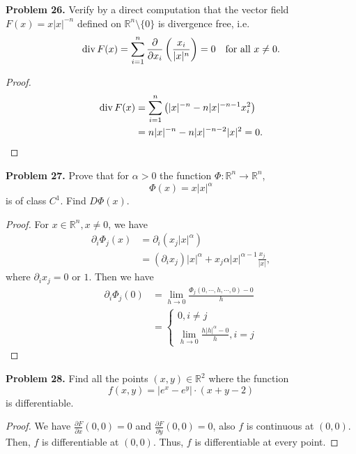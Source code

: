 \documentclass[12pt,leqno]{amsart}
\theoremstyle{definition}
\begin{document}
\medskip

\noindent
{\bf Problem 26.}
Verify by a direct computation that the vector field $F(x)=x|x|^{-n}$ defined on
$\mathbb{R}^n\setminus\{0\}$ is divergence free, i.e.
$$
{\rm div}\, F(x)=\sum_{i=1}^n \frac{\partial}{\partial x_i}\left(\frac{x_i}{|x|^n}\right) = 0
\quad
\mbox{for all $x\neq 0$.}
$$
\begin{proof}
\begin{align*}
    {\rm div}\, F(x) & = \sum^n_{i=1} \left(|x|^{-n} - n |x|^{-n-1} x_i^2\right) \\
    & = n |x|^{-n} - n |x|^{-n-2} |x|^2 = 0.
\end{align*}
\end{proof}

\medskip

\noindent
{\bf Problem 27.}
Prove that for $\alpha>0$ the function $\Phi:\mathbb{R}^n\to\mathbb{R}^n$,
$$
\Phi(x)=x|x|^\alpha
$$
is of class $C^1$. Find $D\Phi(x)$.
\begin{proof}
For $x \in \mathbb{R}^n, x \neq 0$, we have
\begin{align*}
    \partial_i \Phi_j(x) & = \partial_i \left(x_j |x|^\alpha \right) 
    \\
    & = (\partial_i x_j) |x|^\alpha + x_j \alpha |x|^{\alpha-1} \frac{x_j}{|x|},
\end{align*}
where $\partial_i x_j = 0$ or $1$. Then we have
\begin{align*}
    \partial_i \Phi_j(0) & = \lim_{h\to 0} \frac{\Phi_j(0,\cdots, h, \cdots, 0) - 0}{h} \\
    &  = \left\{
    \begin{aligned}
        0, i\neq j\\
        \lim_{h\to 0} \frac{h |h|^\alpha - 0}{h}, i = j
    \end{aligned}
    \right.
\end{align*}
\end{proof}

\medskip

\noindent
{\bf Problem 28.}
Find all the points $(x,y)\in\mathbb{R}^2$ where the function
$$
f(x,y)=|e^x-e^y|\cdot(x+y-2)
$$
is differentiable.
\begin{proof}
We have $\frac{\partial F}{\partial x}(0,0) = 0$ and $\frac{\partial F}{\partial y}(0,0) = 0$, also $f$ is continuous at $(0,0)$. Then, $f$ is differentiable at $(0,0)$. Thus, $f$ is differentiable at every point.
\end{proof}


\medskip
\end{document}
